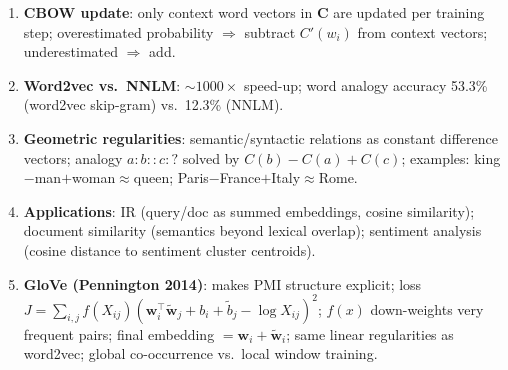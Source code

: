 \documentclass[11pt,a4paper]{article}
\begin{document}
\begin{tcolorbox}[colback=WarningRedBg,colframe=WarningRed,boxrule=0.8pt,arc=3pt]
\begin{enumerate}
  \item \textbf{CBOW update}: only context word vectors in $\mathbf{C}$ are updated per training step; overestimated probability $\Rightarrow$ subtract $C'(w_i)$ from context vectors; underestimated $\Rightarrow$ add.
  \item \textbf{Word2vec vs.\ NNLM}: $\sim\!1000\times$ speed-up; word analogy accuracy 53.3\% (word2vec skip-gram) vs.\ 12.3\% (NNLM).
  \item \textbf{Geometric regularities}: semantic/syntactic relations as constant difference vectors; analogy $a:b::c:?$ solved by $C(b)-C(a)+C(c)$; examples: king$-$man$+$woman$\approx$queen; Paris$-$France$+$Italy$\approx$Rome.
  \item \textbf{Applications}: IR (query/doc as summed embeddings, cosine similarity); document similarity (semantics beyond lexical overlap); sentiment analysis (cosine distance to sentiment cluster centroids).
  \item \textbf{GloVe (Pennington 2014)}: makes PMI structure explicit; loss $J = \sum_{i,j} f(X_{ij})({\mathbf{w}_i^\top\tilde{\mathbf{w}}_j + b_i + \tilde{b}_j - \log X_{ij}})^2$; $f(x)$ down-weights very frequent pairs; final embedding $= \mathbf{w}_i + \tilde{\mathbf{w}}_i$; same linear regularities as word2vec; global co-occurrence vs.\ local window training.
\end{enumerate}
\end{tcolorbox}

\printindex
\end{document}
